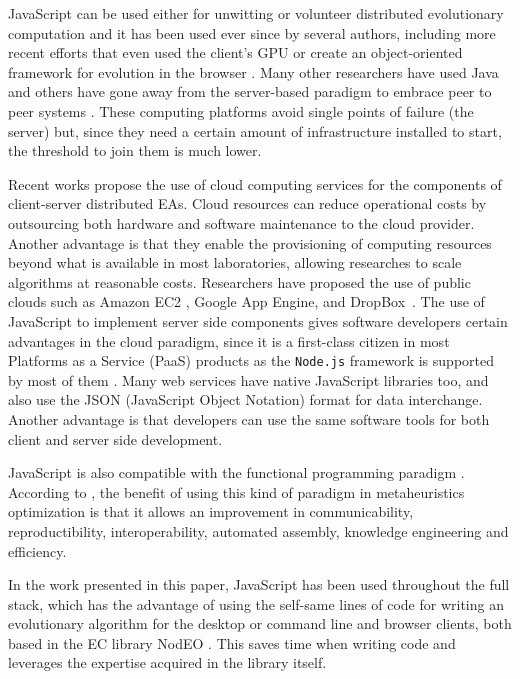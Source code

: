 \documentclass[journal,onecolumn]{IEEEtran}
\begin{document}
JavaScript can be used either for unwitting
\cite{unwitting-ec} or volunteer 
\cite{langdon:2005:metas,gecco07:workshop:dcor} distributed
evolutionary computation and it has been used ever since by several
authors, including more recent efforts
\cite{Desell:2008:AHG:1389095.1389273,duda2013distributed,DBLP:journals/corr/abs-0801-1210} 
that even
used the client's GPU \cite{duda2013gpu} or create an object-oriented
framework for evolution in the browser \cite{EvoStar2014:jsEO}. Many other researchers have
used Java \cite{chong:1999:jDGPi} and others have gone away from the
server-based paradigm to embrace peer to peer systems
\cite{jin2006constructing,10.1109/ICICSE.2008.99,DBLP:conf/3pgcic/GuervosMFEL12}. These computing
platforms avoid single points of failure (the server) but, since they
need a certain amount of infrastructure installed to start, the
threshold to join them is much lower.

Recent works propose the use of cloud computing services for the components of
client-server distributed EAs. Cloud resources
can reduce operational costs by outsourcing both hardware and software maintenance
to the cloud provider. Another advantage is that they enable the provisioning of computing resources beyond what
is available in most laboratories, allowing researches to
scale algorithms at reasonable costs. Researchers have proposed the use of
public clouds such as Amazon EC2 \cite{CloudScale}, Google App Engine\cite{di2013towards},
and DropBox~\cite{mericloud}. The use of JavaScript to implement
server side components
gives software developers certain advantages in the cloud
paradigm, since it is a first-class citizen
in most Platforms as a Service (PaaS) products as the {\tt Node.js} framework is supported by most of them \cite{wood13:nodejs:paas}. Many web services
have native JavaScript libraries too, and also use the JSON (JavaScript Object Notation) format for data interchange. Another advantage is that
developers can use the same software tools for both client and server
side development.

JavaScript is also compatible with the functional programming paradigm \cite{Cousineau1998,MacLennan1990,Thompson1996}.
According to \cite{swanresearch2015}, the benefit of using this kind of paradigm in
metaheuristics optimization is that it allows an improvement in communicability,
reproductibility, interoperability, automated assembly, knowledge engineering
and efficiency.

In the work presented in this paper, JavaScript has been used throughout the full
stack, which has the advantage of using the self-same lines of code for
writing an evolutionary algorithm for the
desktop or command line and browser clients, both based in the EC
library {\sf NodEO} \cite{DBLP:conf/gecco/GuervosVGES14}. This saves time 
when writing code and leverages 
the expertise acquired
 in the library itself. 
\end{document}
